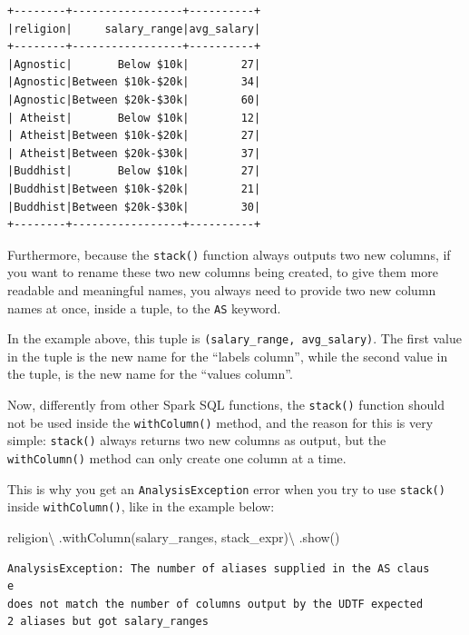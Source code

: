 \documentclass[
  11pt,
  letterpaper,
  DIV=11,
  numbers=noendperiod]{scrreprt}
\newenvironment{Shaded}{\begin{snugshade}}{\end{snugshade}}
\newcommand{\NormalTok}[1]{\textcolor[rgb]{0.00,0.23,0.31}{#1}}
\newcommand{\OperatorTok}[1]{\textcolor[rgb]{0.37,0.37,0.37}{#1}}
\newcommand{\StringTok}[1]{\textcolor[rgb]{0.13,0.47,0.30}{#1}}
\begin{document}
\begin{verbatim}
+--------+-----------------+----------+
|religion|     salary_range|avg_salary|
+--------+-----------------+----------+
|Agnostic|       Below $10k|        27|
|Agnostic|Between $10k-$20k|        34|
|Agnostic|Between $20k-$30k|        60|
| Atheist|       Below $10k|        12|
| Atheist|Between $10k-$20k|        27|
| Atheist|Between $20k-$30k|        37|
|Buddhist|       Below $10k|        27|
|Buddhist|Between $10k-$20k|        21|
|Buddhist|Between $20k-$30k|        30|
+--------+-----------------+----------+
\end{verbatim}

Furthermore, because the \texttt{stack()} function always outputs two
new columns, if you want to rename these two new columns being created,
to give them more readable and meaningful names, you always need to
provide two new column names at once, inside a tuple, to the \texttt{AS}
keyword.

In the example above, this tuple is
\texttt{(salary\_range,\ avg\_salary)}. The first value in the tuple is
the new name for the ``labels column'', while the second value in the
tuple, is the new name for the ``values column''.

Now, differently from other Spark SQL functions, the \texttt{stack()}
function should not be used inside the \texttt{withColumn()} method, and
the reason for this is very simple: \texttt{stack()} always returns two
new columns as output, but the \texttt{withColumn()} method can only
create one column at a time.

This is why you get an \texttt{AnalysisException} error when you try to
use \texttt{stack()} inside \texttt{withColumn()}, like in the example
below:

\begin{Shaded}
\begin{Highlighting}[]
\NormalTok{religion}\OperatorTok{\textbackslash{}}
\NormalTok{    .withColumn(}\StringTok{\textquotesingle{}salary\_ranges\textquotesingle{}}\NormalTok{, stack\_expr)}\OperatorTok{\textbackslash{}}
\NormalTok{    .show()}
\end{Highlighting}
\end{Shaded}

\begin{verbatim}
AnalysisException: The number of aliases supplied in the AS claus
e
does not match the number of columns output by the UDTF expected
2 aliases but got salary_ranges 
\end{verbatim}
\end{document}
